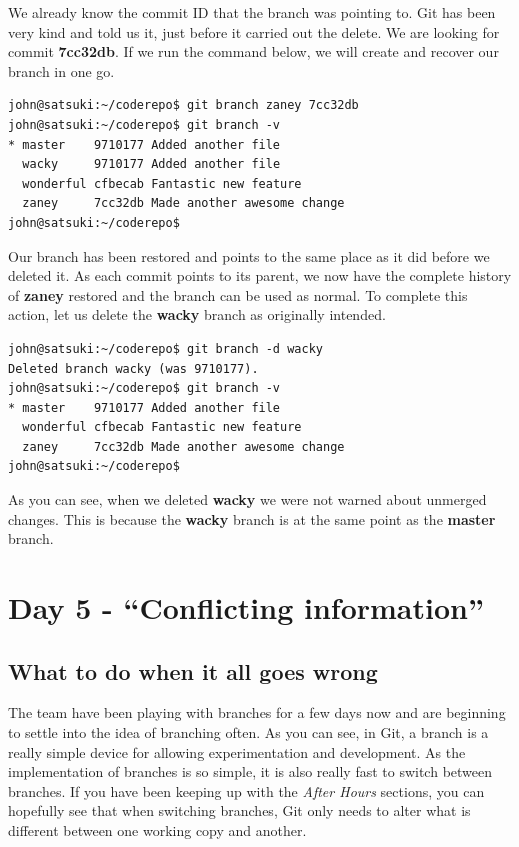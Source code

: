We already know the commit ID that the branch was pointing to.  Git has been very kind and told us it, just before it carried out the delete.  We are looking for commit \textbf{7cc32db}.  If we run the command below, we will create and recover our branch in one go.

\begin{Verbatim}
john@satsuki:~/coderepo$ git branch zaney 7cc32db
john@satsuki:~/coderepo$ git branch -v
* master    9710177 Added another file
  wacky     9710177 Added another file
  wonderful cfbecab Fantastic new feature
  zaney     7cc32db Made another awesome change
john@satsuki:~/coderepo$ 
\end{Verbatim}

Our branch has been restored and points to the same place as it did before we deleted it.  As each commit points to its parent, we now have the complete history of \textbf{zaney} restored and the branch can be used as normal.  To complete this action, let us delete the \textbf{wacky} branch as originally intended.

\begin{Verbatim}
john@satsuki:~/coderepo$ git branch -d wacky
Deleted branch wacky (was 9710177).
john@satsuki:~/coderepo$ git branch -v
* master    9710177 Added another file
  wonderful cfbecab Fantastic new feature
  zaney     7cc32db Made another awesome change
john@satsuki:~/coderepo$ 
\end{Verbatim}

As you can see, when we deleted \textbf{wacky} we were not warned about unmerged changes.  This is because the \textbf{wacky} branch is at the same point as the \textbf{master} branch.  

\section{Day 5 - ``Conflicting information''}
\subsection{What to do when it all goes wrong}

The team have been playing with branches for a few days now and are beginning to settle into the idea of branching often.  As you can see, in Git, a branch is a really simple device for allowing experimentation and development.  As the implementation of branches is so simple, it is also really fast to switch between branches.  If you have been keeping up with the \emph{After Hours} sections, you can hopefully see that when switching branches, Git only needs to alter what is different between one working copy and another.

